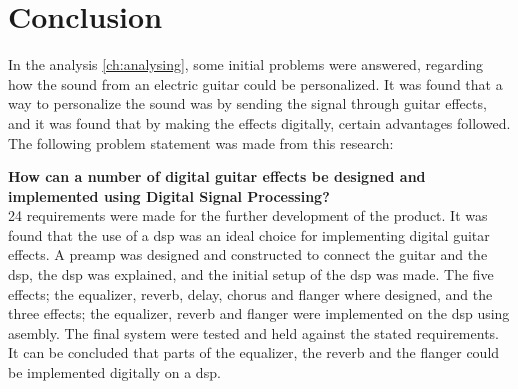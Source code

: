 \section{Conclusion}\label{sec:conclusion}

In the analysis \autoref{ch:analysing}, some initial problems were answered, regarding how the sound from an electric guitar could be personalized. It was found that a way to personalize the sound was by sending the signal through guitar effects, and it was found that by making the effects digitally, certain advantages followed. The following problem statement was made from this research:

\textbf{How can a number of digital guitar effects be designed and implemented using Digital Signal Processing?} \\

24 requirements were made for the further development of the product. 
It was found that the use of a \gls{dsp} was an ideal choice for implementing digital guitar effects. A \gls{preamp} was designed and constructed to connect the guitar and the \gls{dsp}, the \gls{dsp} was explained, and the initial setup of the \gls{dsp} was made. The five effects; the equalizer, \gls{reverb}, delay, chorus and flanger where designed, and the three effects; the equalizer, \gls{reverb} and flanger were implemented on the \gls{dsp} using asembly.
The final system were tested and held against the stated requirements. \\

It can be concluded that parts of the equalizer, the \gls{reverb} and the flanger could be implemented digitally on a \gls{dsp}.  


